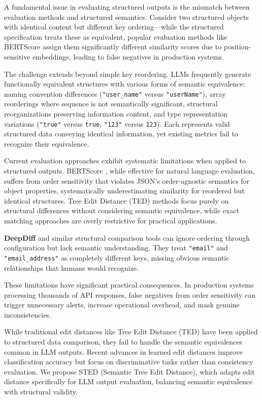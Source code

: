 \documentclass{article}
\begin{document}
A fundamental issue in evaluating structured outputs is the mismatch between evaluation methods and structured semantics. Consider two structured objects with identical content but different key ordering---while the structured specification treats these as equivalent, popular evaluation methods like BERTScore \cite{Zhang2020} assign them significantly different similarity scores due to position-sensitive embeddings, leading to false negatives in production systems.

The challenge extends beyond simple key reordering. LLMs frequently generate functionally equivalent structures with various forms of semantic equivalence: naming convention differences (\texttt{"user\_name"} versus \texttt{"userName"}), array reorderings where sequence is not semantically significant, structural reorganizations preserving information content, and type representation variations (\texttt{"true"} versus \texttt{true}, \texttt{"123"} versus \texttt{123}). Each represents valid structured data conveying identical information, yet existing metrics fail to recognize their equivalence.

Current evaluation approaches exhibit systematic limitations when applied to structured outputs. BERTScore \cite{Zhang2020}, while effective for natural language evaluation, suffers from order sensitivity that violates JSON's order-agnostic semantics for object properties, systematically underestimating similarity for reordered but identical structures. Tree Edit Distance (TED) methods focus purely on structural differences without considering semantic equivalence, while exact matching approaches are overly restrictive for practical applications.

\textbf{DeepDiff} \cite{seperman} and similar structural comparison tools can ignore ordering through configuration but lack semantic understanding. They treat \texttt{"email"} and \texttt{"email\_address"} as completely different keys, missing obvious semantic relationships that humans would recognize.

These limitations have significant practical consequences. In production systems processing thousands of API responses, false negatives from order sensitivity can trigger unnecessary alerts, increase operational overhead, and mask genuine inconsistencies.

While traditional edit distances like Tree Edit Distance (TED) have been applied to structured data comparison, they fail to handle the semantic equivalences common in LLM outputs. Recent advances in learned edit distances \cite{paassen2018tree} improve classification accuracy but focus on discriminative tasks rather than consistency evaluation. We propose STED (Semantic Tree Edit Distance), which adapts edit distance specifically for LLM output evaluation, balancing semantic equivalence with structural validity.
\end{document}
